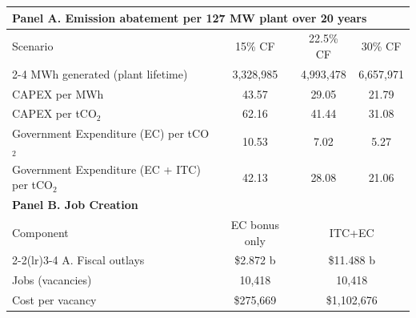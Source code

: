 \begin{tabular}{lccc}
\toprule
\multicolumn{4}{l}{\textbf{Panel A. Emission abatement per 127 MW plant over 20 years}}\\
\midrule
Scenario & 15\% CF & 22.5\% CF & 30\% CF \\
\cmidrule(lr){2-4}
\addlinespace[0.6em]
MWh generated (plant lifetime) & 3,328,985 & 4,993,478 & 6,657,971 \\
CAPEX per MWh & 43.57 & 29.05 & 21.79 \\
CAPEX per tCO$_2$ & 62.16 & 41.44 & 31.08 \\
Government Expenditure (EC) per tCO$_2$ & 10.53 & 7.02 & 5.27 \\
Government Expenditure (EC + ITC) per tCO$_2$ & 42.13 & 28.08 & 21.06 \\
\midrule
\multicolumn{4}{l}{\textbf{Panel B. Job Creation}}\\
\midrule
Component & EC bonus only & \multicolumn{2}{c}{ITC+EC} \\
\cmidrule(lr){2-2}\cmidrule(lr){3-4}
\addlinespace[0.6em]
A. Fiscal outlays & \$2.872 b & \multicolumn{2}{c}{\$11.488 b} \\
Jobs (vacancies) & 10,418 & \multicolumn{2}{c}{10,418} \\
Cost per vacancy & \$275,669 & \multicolumn{2}{c}{\$1,102,676} \\
\bottomrule
\end{tabular}
